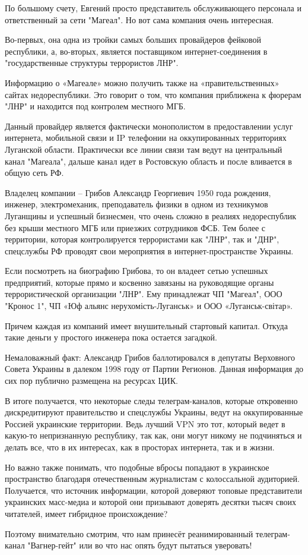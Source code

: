 По большому счету, Евгений просто представитель обслуживающего персонала и
ответственный за сети "Магеал". Но вот сама компания очень интересная.

Во-первых, она одна из тройки самых больших провайдеров фейковой республики, а,
во-вторых, является поставщиком интернет-соединения в "государственные
структуры террористов ЛНР".

Информацию о «Магеале» можно получить также на «правительственных» сайтах
недореспублики. Это говорит о том, что компания приближена к фюрерам "ЛНР" и
находится под контролем местного МГБ.

Данный провайдер является фактически монополистом в предоставлении услуг
интернета, мобильной связи и IP телефонии на оккупированных территориях
Луганской области. Практически все линии связи там ведут на центральный канал
"Магеала", дальше канал идет в Ростовскую область и после вливается в общую
сеть РФ.

Владелец компании – Грибов Александр Георгиевич 1950 года рождения, инженер,
электромеханик, преподаватель физики в одном из техникумов Луганщины и успешный
бизнесмен, что очень сложно в реалиях недореспублик без крыши местного МГБ или
приезжих сотрудников ФСБ. Тем более с территории, которая контролируется
террористами как "ЛНР", так и "ДНР", спецслужбы РФ проводят свои мероприятия в
интернет-пространстве Украины.

Если посмотреть на биографию Грибова, то он владеет сетью успешных предприятий,
которые прямо и косвенно завязаны на руководящие органы террористической
организации "ЛНР". Ему принадлежат ЧП "Магеал", ООО "Кронос 1", ЧП «Юф альянс
нерухомість-Луганськ» и ООО «Луганськ-світар».

Причем каждая из компаний имеет внушительный стартовый капитал. Откуда такие
деньги у простого инженера пока остается загадкой.

Немаловажный факт: Александр Грибов баллотировался в депутаты Верховного Совета
Украины в далеком 1998 году от Партии Регионов. Данная информация до сих пор
публично размещена на ресурсах ЦИК.

В итоге получается, что некоторые следы телеграм-каналов, которые откровенно
дискредитируют правительство и спецслужбы Украины, ведут на оккупированные
Россией украинские территории. Ведь лучший VPN это тот, который ведет в
какую-то непризнанную республику, так как, они могут никому не подчиняться и
делать все, что в их интересах, как в просторах интернета, так и в жизни.

Но важно также понимать, что подобные вбросы попадают в украинское пространство
благодаря отечественным журналистам с колоссальной аудиторией. Получается, что
источник информации, которой доверяют топовые представители украинских
масс-медиа и которой они призывают доверять десятки тысяч своих читателей,
имеет гибридное происхождение?

Поэтому внимательно смотрим, что нам принесёт реанимированный телеграм-канал
"Вагнер-гейт" или во что нас опять будут пытаться уверовать!

